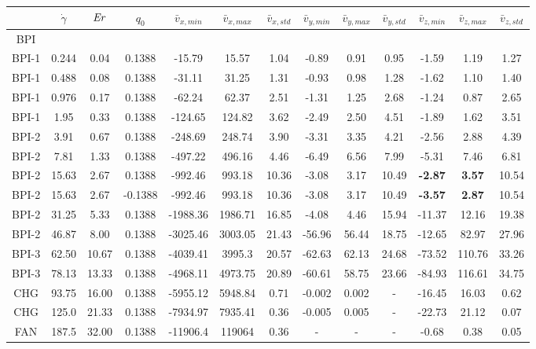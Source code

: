 \documentclass[aps,pre,reprint,superscriptaddress, twocolumn]{revtex4}
\begin{document}
\begin{table}[htpb]
\begin{tabular}{|c||c|| c || c || c |c |c||c| c| c||c| c| c|}
\hline
& $\dot{\gamma}$ & ${\it Er}$ & $q_0$ & $\bar{v}_{x,min}$ & $\bar{v}_{x,max}$ & $\bar{v}_{x,std}$ & $\bar{v}_{y,min}$ & $\bar{v}_{y,max}$ & $\bar{v}_{y,std}$ & $\bar{v}_{z,min}$ & $\bar{v}_{z,max}$ & $\bar{v}_{z,std}$ \\
\hline
BPI \\
\hline
BPI-1 & 0.244 & 0.04& 0.1388 &-15.79 &15.57 &1.04 &-0.89 &0.91 &0.95 &-1.59 &1.19 &1.27 \\
BPI-1 & 0.488 & 0.08 & 0.1388 &-31.11 &31.25 &1.31 &-0.93 &0.98 &1.28 &-1.62 &1.10 &1.40 \\
BPI-1 & 0.976 & 0.17 & 0.1388 &-62.24 &62.37 &2.51 &-1.31 &1.25 &2.68 &-1.24 &0.87 &2.65 \\
BPI-1 & 1.95 & 0.33 & 0.1388 &-124.65 &124.82 &3.62&  -2.49 &2.50 &4.51 &-1.89 & 1.62 &3.51 \\
\hline
BPI-2 & 3.91 & 0.67 & 0.1388 &-248.69 &248.74 &3.90&  -3.31 &3.35 &4.21 &-2.56 & 2.88 &4.39 \\
BPI-2 & 7.81 & 1.33 & 0.1388 &-497.22 &496.16 &4.46 &-6.49 &6.56 &7.99 &-5.31 & 7.46 &6.81 \\ 
BPI-2 & 15.63 & 2.67 & 0.1388 &-992.46 &993.18 &10.36 &-3.08 &3.17 &10.49 &\bf{-2.87} & \bf{3.57} &10.54 \\
BPI-2 & 15.63 & 2.67 & -0.1388 &-992.46 &993.18 &10.36 &-3.08 &3.17 &10.49 &\bf{-3.57} & \bf{2.87} &10.54 \\
BPI-2 & 31.25 &5.33 & 0.1388 & -1988.36 &1986.71 &16.85 &-4.08 &4.46 &15.94 &-11.37 & 12.16 &19.38\\
BPI-2 & 46.87 & 8.00 & 0.1388 & -3025.46 & 3003.05 &21.43 & -56.96 & 56.44  & 18.75 & -12.65 & 82.97  & 27.96\\
\hline
BPI-3 & 62.50 & 10.67& 0.1388 & -4039.41 &3995.3  & 20.57 & -62.63 & 62.13 & 24.68 &-73.52 & 110.76 & 33.26 \\
BPI-3 &78.13 &13.33 & 0.1388 & -4968.11 &4973.75 &20.89 &-60.61 &58.75 &23.66 &-84.93 &116.61 &34.75 \\
\hline
CHG & 93.75 &16.00 & 0.1388 & -5955.12 &5948.84 & 0.71 & -0.002 & 0.002 & -  & -16.45 & 16.03 &0.62 \\
CHG & 125.0 & 21.33& 0.1388 & -7934.97 & 7935.41 & 0.36 & -0.005 & 0.005 & - &-22.73 & 21.12 & 0.07\\
\hline
FAN & 187.5 & 32.00& 0.1388 &-11906.4  &119064 &0.36 &- &- &- &-0.68 & 0.38 & 0.05\\
\hline


\end{tabular}
\end{table}
\end{document}

